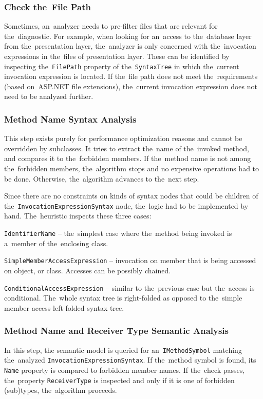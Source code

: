 \documentclass[
  digital, %
  table,   %
  lof,     %
  lot,     %
  oneside,
]{fithesis3}
\begin{document}
\subsubsection{\textbf{Check the~File Path}}
Sometimes, an~analyzer needs to pre-filter files that are relevant for the~diagnostic. For example, when looking for an~access to the~database layer from the~presentation layer, the~analyzer is only concerned with the~invocation expressions in the~files of presentation layer. These can be identified by inspecting the~\texttt{FilePath} property of the~\texttt{SyntaxTree} in which the~current invocation expression is located. If the~file path does not meet the~requirements (based on~ASP.NET file extensions), the~current invocation expression does not need to be analyzed further.

\subsubsection{\textbf{Method Name Syntax Analysis}}
This step exists purely for performance optimization reasons and cannot be overridden by subclasses. It tries to extract the~name of the~invoked method, and compares it to the~forbidden members. If the~method name is not among the~forbidden members, the~algorithm stops and no expensive operations had to be done. Otherwise, the~algorithm advances to the~next step.

Since there are no constraints on kinds of syntax nodes that could be children of the~\texttt{InvocationExpressionSyntax} node, the~logic had to be implemented by hand. The~heuristic inspects these three cases:
\begin{compactitem}
  \item[\texttt{IdentifierName}] -- the~simplest case where the~method being invoked is a~member of the~enclosing class.
    
  \item[\texttt{SimpleMemberAccessExpression}] -- invocation on member that is being accessed on object, or class. Accesses can be possibly chained.    

  \item[\texttt{ConditionalAccessExpression}] -- similar to the~previous case but the~access is conditional. The~whole syntax tree is right-folded as opposed to the~simple member access left-folded syntax tree. 
\end{compactitem}

\subsubsection{\textbf{Method Name and Receiver Type Semantic Analysis}}
In this step, the semantic model is queried for an~\texttt{IMethodSymbol} matching the~analyzed \texttt{InvocationExpressionSyntax}. If the~method symbol is found, its \texttt{Name} property is compared to forbidden member names. If the~check passes, the~property \texttt{ReceiverType} is inspected and only if it is one of forbidden (sub)types, the~algorithm proceeds. 
\end{document}
